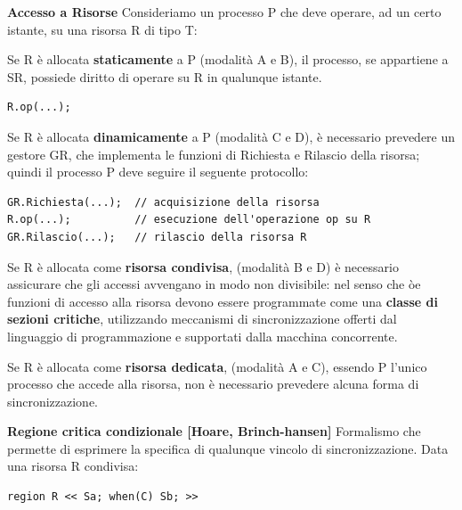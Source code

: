 \documentclass{article}
\begin{document}
\vspace{5mm}
{\large \textbf{Accesso a Risorse}}
Consideriamo un processo P che deve operare, ad un certo istante, su una risorsa R di tipo T:

Se R è allocata \textbf{staticamente} a P (modalità A e B), il processo, se appartiene a SR, possiede diritto di operare su R in qualunque istante.
\vspace{3mm}
\begin{lstlisting}
R.op(...);
\end{lstlisting}

Se R è allocata \textbf{dinamicamente} a P (modalità C e D), è necessario prevedere un gestore GR, che implementa le funzioni di Richiesta e Rilascio della risorsa; quindi il
processo P deve seguire il seguente protocollo:

\vspace{3mm}
\begin{lstlisting}
GR.Richiesta(...);  // acquisizione della risorsa
R.op(...);          // esecuzione dell'operazione op su R
GR.Rilascio(...);   // rilascio della risorsa R
\end{lstlisting}

\vspace{3mm}
Se R è allocata come \textbf{risorsa condivisa}, (modalità B e D) è necessario assicurare che gli accessi avvengano in modo non divisibile: nel senso che òe funzioni di accesso alla
risorsa devono essere programmate come una \textbf{classe di sezioni critiche}, utilizzando meccanismi di sincronizzazione offerti dal linguaggio di programmazione e supportati
dalla macchina concorrente.

\vspace{3mm}
Se R è allocata come \textbf{risorsa dedicata}, (modalità A e C), essendo P l'unico processo che accede alla risorsa, non è necessario prevedere alcuna forma di sincronizzazione.

\vspace{5mm}
{\large \textbf{Regione critica condizionale [Hoare, Brinch-hansen]}}
Formalismo che permette di esprimere la specifica di qualunque vincolo di sincronizzazione. Data una risorsa R condivisa:

\begin{lstlisting}
region R << Sa; when(C) Sb; >>
\end{lstlisting}
\end{document}
